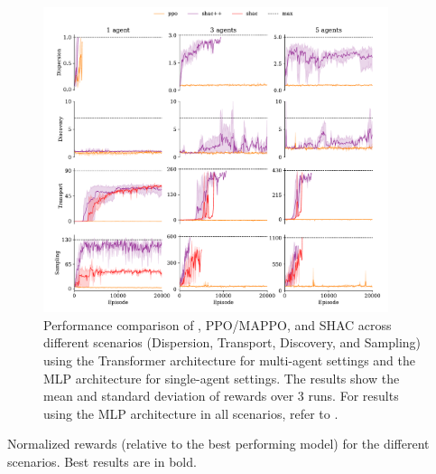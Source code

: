 \begin{figure}
    \centering
    \includegraphics[width=0.9\textwidth]{figs/main-transformer.pdf}
    \caption{Performance comparison of \fname{}, PPO/MAPPO, and SHAC across different scenarios (Dispersion, Transport, Discovery, and Sampling) using the Transformer architecture for multi-agent settings and the MLP architecture for single-agent settings. The results show the mean and standard deviation of rewards over 3 runs. For results using the MLP architecture in all scenarios, refer to .}%
    \label{fig:experiments}
\end{figure}

\begin{table}
    \centering
    
    \vspace{0.2cm}
    \caption{Normalized rewards (relative to the best performing model) for the different scenarios. Best results are in bold.}\label{tab:max-rewards}
\end{table}


